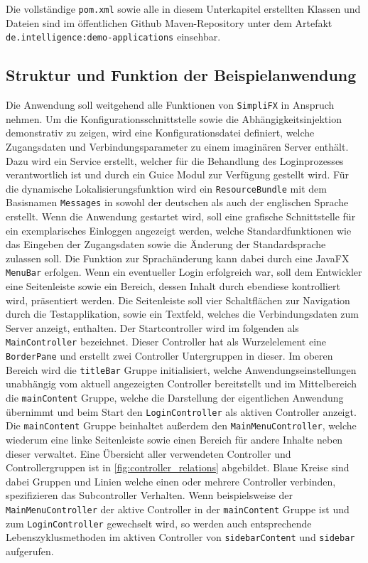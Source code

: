 Die vollständige \texttt{pom.xml} sowie alle in diesem Unterkapitel erstellten Klassen und Dateien sind im öffentlichen Github Maven-Repository unter dem Artefakt \texttt{de.intelligence:demo-applications} einsehbar.
\subsection{Struktur und Funktion der Beispielanwendung}
Die Anwendung soll weitgehend alle Funktionen von \texttt{SimpliFX} in Anspruch nehmen. Um die Konfigurationsschnittstelle sowie die Abhängigkeitsinjektion demonstrativ zu zeigen, wird eine Konfigurationsdatei definiert, welche Zugangsdaten und Verbindungsparameter zu einem imaginären Server enthält. Dazu wird ein Service erstellt, welcher für die Behandlung des Loginprozesses verantwortlich ist und durch ein Guice Modul zur Verfügung gestellt wird. Für die dynamische Lokalisierungsfunktion wird ein \texttt{ResourceBundle} mit dem Basisnamen \texttt{Messages} in sowohl der deutschen als auch der englischen Sprache erstellt. Wenn die Anwendung gestartet wird, soll eine grafische Schnittstelle für ein exemplarisches Einloggen angezeigt werden, welche Standardfunktionen wie das Eingeben der Zugangsdaten sowie die Änderung der Standardsprache zulassen soll. Die Funktion zur Sprachänderung kann dabei durch eine JavaFX \texttt{MenuBar} erfolgen. Wenn ein eventueller Login erfolgreich war, soll dem Entwickler eine Seitenleiste sowie ein Bereich, dessen Inhalt durch ebendiese kontrolliert wird, präsentiert werden. Die Seitenleiste soll vier Schaltflächen zur Navigation durch die Testapplikation, sowie ein Textfeld, welches die Verbindungsdaten zum Server anzeigt, enthalten. Der Startcontroller wird im folgenden als \texttt{MainController} bezeichnet. 
Dieser Controller hat als Wurzelelement eine \texttt{BorderPane} und erstellt zwei Controller Untergruppen in dieser. Im oberen Bereich wird die \texttt{titleBar} Gruppe initialisiert, welche Anwendungseinstellungen unabhängig vom aktuell angezeigten Controller bereitstellt und im Mittelbereich die \texttt{mainContent} Gruppe, welche die Darstellung der eigentlichen Anwendung übernimmt und beim Start den \texttt{LoginController} als aktiven Controller anzeigt. Die \texttt{mainContent} Gruppe beinhaltet außerdem den \texttt{MainMenuController}, welche wiederum eine linke Seitenleiste sowie einen Bereich für andere Inhalte neben dieser verwaltet. Eine Übersicht aller verwendeten Controller und Controllergruppen ist in \autoref{fig:controller_relations} abgebildet. Blaue Kreise sind dabei Gruppen und Linien welche einen oder mehrere Controller verbinden, spezifizieren das Subcontroller Verhalten. Wenn beispielsweise der \texttt{MainMenuController} der aktive Controller in der \texttt{mainContent} Gruppe ist und zum \texttt{LoginController} gewechselt wird, so werden auch entsprechende Lebenszyklusmethoden im aktiven Controller von \texttt{sidebarContent} und \texttt{sidebar} aufgerufen.
